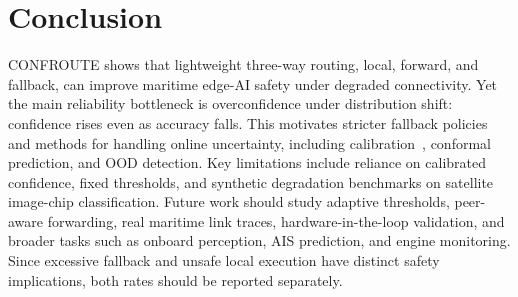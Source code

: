 \documentclass[10pt, conference]{IEEEtran}
\begin{document}

\section{Conclusion}
CONFROUTE shows that lightweight three-way routing, local, forward, and fallback, can improve maritime edge-AI safety under degraded connectivity. Yet the main reliability bottleneck is overconfidence under distribution shift: confidence rises even as accuracy falls. This motivates stricter fallback policies and methods for handling online uncertainty, including calibration~\cite{guo2017calibration}, conformal prediction, and OOD detection. Key limitations include reliance on calibrated confidence, fixed thresholds, and synthetic degradation benchmarks on satellite image-chip classification. Future work should study adaptive thresholds, peer-aware forwarding, real maritime link traces, hardware-in-the-loop validation, and broader tasks such as onboard perception, AIS prediction, and engine monitoring. Since excessive fallback and unsafe local execution have distinct safety implications, both rates should be reported separately.

\end{document}

